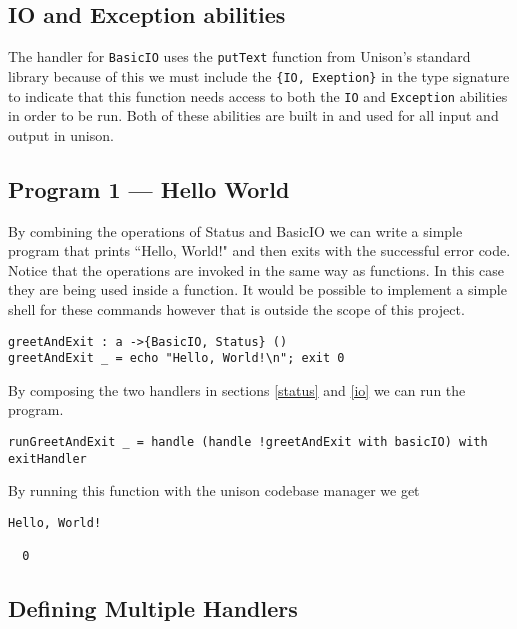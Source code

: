 \documentclass[logo,bsc,singlespacing,parskip]{infthesis}
\begin{document}
\subsection{IO and Exception abilities}

The handler for \texttt{BasicIO} uses the \texttt{putText} function from
Unison's standard library because of this we must include the \texttt{\{IO,
Exeption\}} in the type signature to indicate that this function needs access
to both the \texttt{IO} and \texttt{Exception} abilities in order to be run.
Both of these abilities are built in and used for all input and output in
unison.

\begin{tcolorbox}[colback=gray!10, colframe=black, arc=0pt, outer arc=0pt]

\section*{Program 1 --- Hello World}
\label{prog:helloworld}

By combining the operations of Status and BasicIO we can write a simple program that prints ``Hello, World!" and then exits with the successful error code. Notice that the operations are invoked in the same way as functions. In this case they are being used inside a function. It would be possible to implement a simple shell for these commands however that is outside the scope of this project.

\begin{lstlisting}[language=unison]
greetAndExit : a ->{BasicIO, Status} ()
greetAndExit _ = echo "Hello, World!\n"; exit 0
\end{lstlisting}

By composing the two handlers in sections \ref{status} and \ref{io} we can run the program.

\begin{lstlisting}[language=unison]
runGreetAndExit _ = handle (handle !greetAndExit with basicIO) with exitHandler
\end{lstlisting}

By running this function with the unison codebase manager we get

\begin{lstlisting}[style=terminal]
Hello, World!

  0
\end{lstlisting}
\end{tcolorbox}

\subsection{Defining Multiple Handlers}
\end{document}
